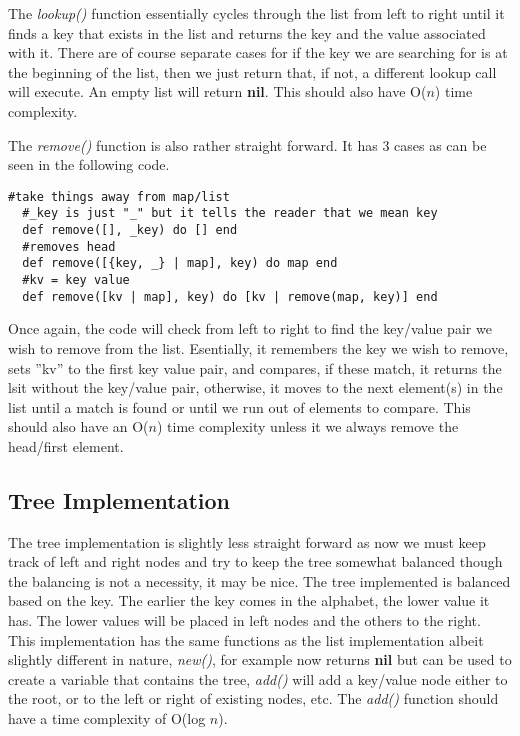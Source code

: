 \documentclass[a4paper,11pt]{article}
\begin{document}
The \textit{lookup()} function essentially cycles through the list from left to right until it finds a key that exists in the list and returns the key and the value associated with it. There are of course separate cases for if the key we are searching for is at the beginning of the list, then we just return that, if not, a different lookup call will execute. An empty list will return \textbf{nil}. This should also have O($n$) time complexity.

The \textit{remove()} function is also rather straight forward. It has 3 cases as can be seen in the following code.
\begin{verbatim}
#take things away from map/list
  #_key is just "_" but it tells the reader that we mean key 
  def remove([], _key) do [] end
  #removes head
  def remove([{key, _} | map], key) do map end
  #kv = key value
  def remove([kv | map], key) do [kv | remove(map, key)] end
  \end{verbatim}
Once again, the code will check from left to right to find the key/value pair we wish to remove from the list. Esentially, it remembers the key we wish to remove, sets ''kv'' to the first key value pair, and compares, if these match, it returns the lsit without the key/value pair, otherwise, it moves to the next element(s) in the list until a match is found or until we run out of elements to compare. This should also have an O($n$) time complexity unless it we always remove the head/first element.

\subsection*{
	\textbf{Tree Implementation}
	}
The tree implementation is slightly less straight forward as now we must keep track of left and right nodes and try to keep the tree somewhat balanced though the balancing is not a necessity, it may be nice. The tree implemented is balanced based on the key. The earlier the key comes in the alphabet, the lower value it has. The lower values will be placed in left nodes and the others to the right. This implementation has the same functions as the list implementation albeit slightly different in nature, \textit{new()}, for example now returns \textbf{nil} but can be used to create a variable that contains the tree, \textit{add()} will add a key/value node either to the root, or to the left or right of existing nodes, etc. The \textit{add()} function should have a time complexity of O(log $n$).
\end{document}

